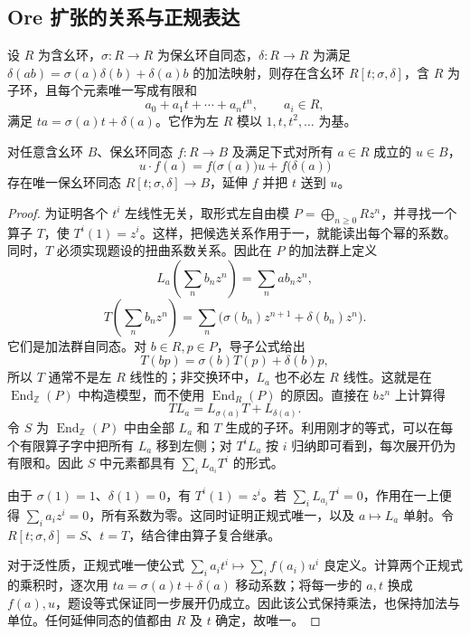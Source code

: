 \subsection{Ore 扩张的关系与正规表达}
\label{b2:subsec:2005:02}

\begin{theorem}\label{b2:thm:ore-extension-construction}
	设 \(R\) 为含幺环，\(\sigma:R\rightarrow R\) 为保幺环自同态，\(\delta:R\rightarrow R\) 为满足 \(\delta(ab)=\sigma(a)\delta(b)+\delta(a)b\) 的加法映射，则存在含幺环 \(R[t;\sigma,\delta]\)，含 \(R\) 为子环，且每个元素唯一写成有限和
	\[
		a_0+a_1t+\cdots+a_nt^n,\qquad a_i\in R,
	\]
	满足 \(ta=\sigma(a)t+\delta(a)\)。它作为左 \(R\) 模以 \(1,t,t^2,\ldots\) 为基。

	对任意含幺环 \(B\)、保幺环同态 \(f:R\to B\) 及满足下式对所有 \(a\in R\) 成立的 \(u\in B\)，
	\[
		u\cdot f(a)=f\bigl(\sigma(a)\bigr)u+f\bigl(\delta(a)\bigr)
	\]
	存在唯一保幺环同态 \(R[t;\sigma,\delta]\to B\)，延伸 \(f\) 并把 \(t\) 送到 \(u\)。
\end{theorem}
\begin{proof}
	为证明各个 \(t^i\) 左线性无关，取形式左自由模 \(P=\bigoplus_{n\ge0}Rz^n\)，并寻找一个算子 \(T\)，使 \(T^i(1)=z^i\)。这样，把候选关系作用于一，就能读出每个幂的系数。同时，\(T\) 必须实现题设的扭曲系数关系。因此在 \(P\) 的加法群上定义
	\[
		L_a\left(\sum_n b_nz^n\right)=\sum_n ab_nz^n,
	\]
	\[
		T\left(\sum_n b_nz^n\right) =\sum_n\bigl(\sigma(b_n)z^{n+1}+\delta(b_n)z^n\bigr).
	\]
	它们是加法群自同态。对 \(b\in R,p\in P\)，导子公式给出
	\[
		T(bp)=\sigma(b)T(p)+\delta(b)p,
	\]
	所以 \(T\) 通常不是左 \(R\) 线性的；非交换环中，\(L_a\) 也不必左 \(R\) 线性。这就是在 \(\operatorname{End}_{\mathbb Z}(P)\) 中构造模型，而不使用 \(\operatorname{End}_R(P)\) 的原因。直接在 \(bz^n\) 上计算得
	\[
		TL_a=L_{\sigma(a)}T+L_{\delta(a)}.
	\]
	令 \(S\) 为 \(\operatorname{End}_{\mathbb Z}(P)\) 中由全部 \(L_a\) 和 \(T\) 生成的子环。利用刚才的等式，可以在每个有限算子字中把所有 \(L_a\) 移到左侧；对 \(T^iL_a\) 按 \(i\) 归纳即可看到，每次展开仍为有限和。因此 \(S\) 中元素都具有 \(\sum_iL_{a_i}T^i\) 的形式。

	由于 \(\sigma(1)=1\)、\(\delta(1)=0\)，有 \(T^i(1)=z^i\)。若 \(\sum_iL_{a_i}T^i=0\)，作用在一上便得 \(\sum_i a_iz^i=0\)，所有系数为零。这同时证明正规式唯一，以及 \(a\mapsto L_a\) 单射。令 \(R[t;\sigma,\delta]=S\)、\(t=T\)，结合律由算子复合继承。

	对于泛性质，正规式唯一使公式 \(\sum_i a_it^i\mapsto\sum_i f(a_i)u^i\) 良定义。计算两个正规式的乘积时，逐次用 \(ta=\sigma(a)t+\delta(a)\) 移动系数；将每一步的 \(a,t\) 换成 \(f(a),u\)，题设等式保证同一步展开仍成立。因此该公式保持乘法，也保持加法与单位。任何延伸同态的值都由 \(R\) 及 \(t\) 确定，故唯一。
\end{proof}

